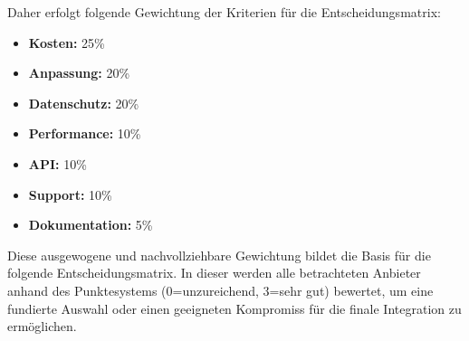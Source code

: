     \global\def\VGewichtKosten           {25}
    \global\def\VGewichtAnpassung        {20}
    \global\def\VGewichtDatenschutz      {20}
    \global\def\VGewichtPerformance      {10}
    \global\def\VGewichtAPI              {10}
    \global\def\VGewichtSupport          {10}
    \global\def\VGewichtDokumentation    {5}

    Daher erfolgt folgende Gewichtung der Kriterien für die Entscheidungsmatrix:
    \begin{itemize}
      \item \textbf{Kosten:} \VGewichtKosten\%
      \item \textbf{Anpassung:} \VGewichtAnpassung\%
      \item \textbf{Datenschutz:} \VGewichtDatenschutz\%
      \item \textbf{Performance:} \VGewichtPerformance\%
      \item \textbf{API:} \VGewichtAPI\%
      \item \textbf{Support:} \VGewichtSupport\%
      \item \textbf{Dokumentation:} \VGewichtDokumentation\%
    \end{itemize}

    Diese ausgewogene und nachvollziehbare Gewichtung bildet die Basis für die folgende Entscheidungsmatrix.
    In dieser werden alle betrachteten Anbieter anhand des Punktesystems (0{=}unzureichend, 3{=}sehr gut) bewertet, um eine fundierte Auswahl oder einen geeigneten Kompromiss für die finale Integration zu ermöglichen.

